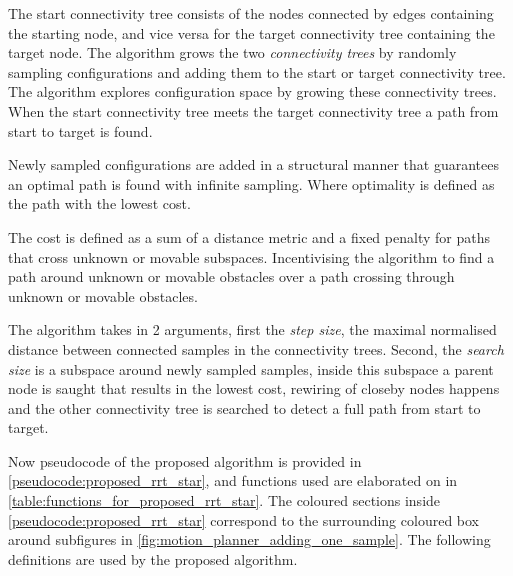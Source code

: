 The start connectivity tree consists of the nodes connected by edges containing the starting node, and vice versa for the target connectivity tree containing the target node. The algorithm grows the two \textit{connectivity trees} by randomly sampling configurations and adding them to the start or target connectivity tree. The algorithm explores configuration space by growing these connectivity trees. When the start connectivity tree meets the target connectivity tree a path from start to target is found.\bs

Newly sampled configurations are added in a structural manner that guarantees an optimal path is found with infinite sampling. Where optimality is defined as the path with the lowest cost.


The cost is defined as a sum of a distance metric and a fixed penalty for paths that cross unknown or movable subspaces. Incentivising the algorithm to find a path around unknown or movable obstacles over a path crossing through unknown or movable obstacles.\bs

The algorithm takes in 2 arguments, first the \textit{step size}, the maximal normalised distance between connected samples in the connectivity trees. Second, the \textit{search size} is a subspace around newly sampled samples, inside this subspace a parent node is saught that results in the lowest cost, rewiring of closeby nodes happens and the other connectivity tree is searched to detect a full path from start to target.\bs

Now pseudocode of the proposed algorithm is provided in \cref{pseudocode:proposed_rrt_star}, and functions used are elaborated on in \cref{table:functions_for_proposed_rrt_star}. The coloured sections inside \cref{pseudocode:proposed_rrt_star} correspond to the surrounding coloured box around subfigures in \cref{fig:motion_planner_adding_one_sample}. The following definitions are used by the proposed algorithm.\bs



